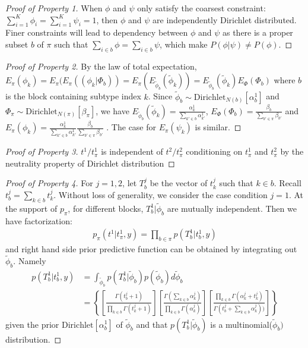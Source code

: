 \documentclass[aoas,preprint]{imsart}
\begin{document}
\begin{proof}[Proof of Property 1]
When $\phi$ and $\psi$ only satisfy the coarsest constraint: 
$\sum_{i = 1}^K \phi_i = \sum_{i = 1}^K \psi_i = 1$, then
 $\phi$ and $\psi$ are independently Dirichlet distributed.
Finer constraints will lead to dependency between $\phi$ and $\psi$  as there is a proper subset $b$ of $\pi$ such that $\sum_{i\in b} \phi = \sum_{i \in b} \psi$, which make $P(\phi | \psi ) \neq P(\phi)$.
\end{proof}

\begin{proof}[Proof of Property 2]
By the law of total expectation, 
$E_{\pi}(\phi_k) = E_{\pi}(E_\pi((\phi_k | \Phi_b)) = E_\pi(E_{\tilde{\phi}_b}(\tilde{\phi}_k)) =  E_{\tilde{\phi}_b}(\tilde{\phi}_k)E_{\Phi}(\Phi_b)$ where $b$ is the block containing subtype index $k$. 
Since $\tilde{\phi}_b \sim  \text{Dirichlet}_{N(b)}[ \alpha_b^1 ]$ and  $\Phi_\pi  \sim \text{Dirichlet}_{N(\pi)}[   \beta_\pi   ] $,
we have $E_{\tilde{\phi}_b}(\tilde{\phi}_k) =  \frac{ \alpha^1_k }{ \sum_{k' \in b} \alpha^1_{k'} } $, $E_{\Phi}(\Phi_b) = \frac{ \beta_b }{ \sum_{b' \in \pi} \beta_{b'} } $ and $E_{\pi}(\phi_k) = \frac{ \alpha^1_k }{ \sum_{k' \in b} \alpha^1_{k'} } \frac{ \beta_b }{ \sum_{b' \in \pi} \beta_{b'} } $ . 
The case for $E_{\pi}(\psi_k)$ is similar.
\end{proof}

\begin{proof}[Proof of Property 3]
$t^1 / t_{\pi}^1$ is independent of $t^2 / t_{\pi}^2$ conditioning on $t_\pi^1$ and $t_\pi^2$ by the 
neutrality property of Dirichlet distribution
\end{proof}

\begin{proof}[Proof of Property 4]
For $j = 1,2$,
let $T_b^j$ be the vector of $t_k^j$ such that $k \in b$. Recall $t_b^j = \sum_{k \in b} t_k^j$.
Without loss of generality, we consider the case condition $j = 1$.
At the support of $p_\pi$, for different blocks, $T_b^1 | \tilde \phi_b$ are mutually independent. Then we have factorization:
\begin{eqnarray*}
p_\pi(t^1 | t_\pi^1, y) = \prod_{b\in \pi}p(T_b^1 | t_b^1,y) 
\end{eqnarray*}
and right hand side prior predictive function can be obtained by integrating out $ \tilde{\phi}_b$. Namely
\begin{align*}
p(T_b^1  | t_b^1,y) &= \int_{\tilde{\phi}_b} p(T_b^1  | \tilde{\phi}_b) p(\tilde{\phi}_b) d\tilde{\phi}_b\\
                                      &= \left\{\left[ \frac{ \Gamma(t^j_b +1 ) }{\prod_{k \in b} \Gamma( t^j_k + 1 ) }\right]
\left[ \frac{\Gamma( \sum_{k \in b} \alpha_k^j )}{
		\prod_{k\in b} \Gamma( \alpha_k^j ) } \right] 
       \left[        \frac{ \prod_{k \in b} \Gamma(\alpha_k^j + t^j_k)  }{
		\Gamma(t^j_b + \sum_{k\in b} \alpha_k^j ) )}\right]\right\}
\end{align*}
given the prior $\text{Dirichlet} [ \alpha_b^1]$ of $ \tilde{\phi}_b$ and  that 
$p(T_b^1  | \tilde{\phi}_b)$ is a multinomial($\tilde{\phi}_b)$ distribution.
\end{proof}
\end{document}
